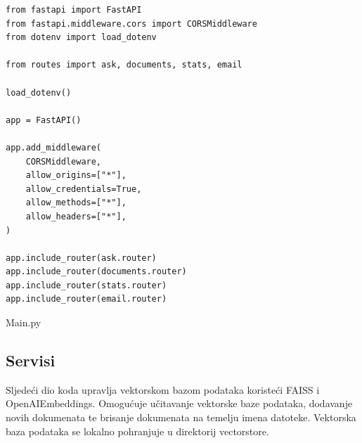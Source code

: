 \documentclass[]{foi}
\begin{document}
\begin{longlisting}
\begin{verbatim}
from fastapi import FastAPI
from fastapi.middleware.cors import CORSMiddleware
from dotenv import load_dotenv

from routes import ask, documents, stats, email

load_dotenv()

app = FastAPI()

app.add_middleware(
    CORSMiddleware,
    allow_origins=["*"],
    allow_credentials=True,
    allow_methods=["*"],
    allow_headers=["*"],
)

app.include_router(ask.router)
app.include_router(documents.router)
app.include_router(stats.router)
app.include_router(email.router)

\end{verbatim}
\caption{Main.py}
\label{lst:main}
\end{longlisting}


\subsection{Servisi}

Sljedeći dio koda upravlja vektorskom bazom podataka koristeći FAISS i OpenAIEmbeddings. Omogućuje učitavanje vektorske baze podataka, dodavanje
novih dokumenata te brisanje dokumenata na temelju imena datoteke. Vektorska baza podataka se lokalno pohranjuje u direktorij vectorstore.
\end{document}
